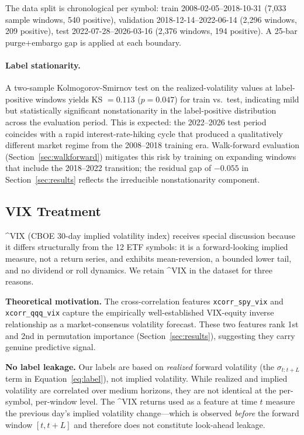 \documentclass[sigconf]{acmart}
\begin{document}
\noindent The data split is chronological per symbol: train
2008-02-05--2018-10-31 (7,033 sample windows, 540 positive), validation
2018-12-14--2022-06-14 (2,296 windows, 209 positive), test
2022-07-28--2026-03-16 (2,376 windows, 194 positive). A 25-bar
purge+embargo gap is applied at each boundary.

\paragraph{Label stationarity.}
A two-sample Kolmogorov-Smirnov test on the realized-volatility values at
label-positive windows yields KS $= 0.113$ ($p = 0.047$) for train vs.\ test,
indicating mild but statistically significant nonstationarity in the
label-positive distribution across the evaluation period.
This is expected: the 2022--2026 test period coincides with a rapid
interest-rate-hiking cycle that produced a qualitatively different market
regime from the 2008--2018 training era. Walk-forward evaluation (Section~\ref{sec:walkforward})
mitigates this risk by training on expanding windows that include the
2018--2022 transition; the residual gap of $-0.055$ in Section~\ref{sec:results}
reflects the irreducible nonstationarity component.

\subsection{VIX Treatment}
\label{sec:vix_treatment}

\^{}VIX (CBOE 30-day implied volatility index) receives special discussion
because it differs structurally from the 12 ETF symbols: it is a
forward-looking implied measure, not a return series, and exhibits
mean-reversion, a bounded lower tail, and no dividend or roll dynamics.
We retain \^{}VIX in the dataset for three reasons.

\textbf{Theoretical motivation.}
The cross-correlation features \texttt{xcorr\_spy\_vix} and \texttt{xcorr\_qqq\_vix}
capture the empirically well-established VIX-equity inverse relationship
\cite{cont2001} as a market-consensus volatility forecast.
These two features rank 1st and 2nd in permutation importance
(Section~\ref{sec:results}), suggesting they carry genuine predictive signal.

\textbf{No label leakage.}
Our labels are based on \emph{realized} forward volatility (the
$\sigma_{t:t+L}$ term in Equation~\ref{eq:label}), not implied volatility.
While realized and implied volatility are correlated over medium horizons,
they are not identical at the per-symbol, per-window level. The
\^{}VIX returns used as a feature at time $t$ measure the previous day's
implied volatility change---which is observed \emph{before} the forward
window $[t, t{+}L]$ and therefore does not constitute look-ahead leakage.
\end{document}

